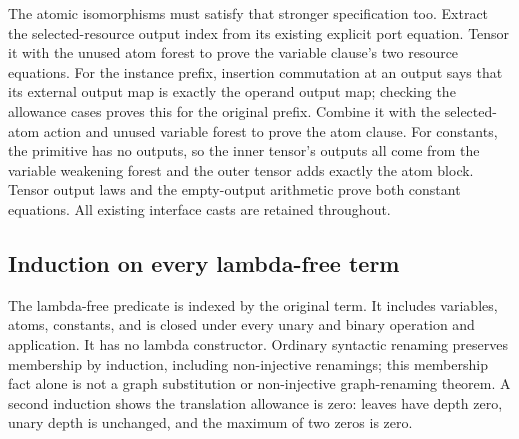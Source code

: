 
The atomic isomorphisms must satisfy that stronger specification too.
Extract the selected-resource output index from its existing explicit port
equation. Tensor it with the unused atom forest to prove the variable clause's
two resource equations. For the instance prefix, insertion commutation at an
output says that its external output map is exactly the operand output map;
checking the allowance cases proves this for the original prefix. Combine it
with the selected-atom action and unused variable forest to prove the atom clause.
For constants, the primitive has no outputs, so the inner tensor's outputs all
come from the variable weakening forest and the outer tensor adds exactly the
atom block. Tensor output laws and the empty-output arithmetic prove both
constant equations. All existing interface casts are retained throughout.


\subsection{Induction on every lambda-free term}

The lambda-free predicate is indexed by the original term. It includes
variables, atoms, constants, and is closed under every unary and binary operation
and application. It has no lambda constructor. Ordinary syntactic renaming
preserves membership by induction, including non-injective renamings; this
membership fact alone is not a graph substitution or non-injective graph-renaming
theorem. A second induction shows the translation allowance is zero: leaves
have depth zero, unary depth is unchanged, and the maximum of two zeros is zero.


